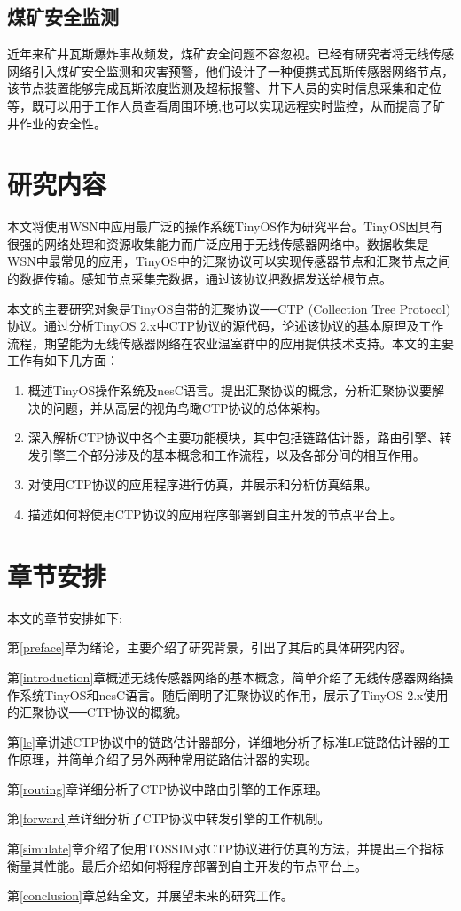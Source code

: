 \subsection{煤矿安全监测}
近年来矿井瓦斯爆炸事故频发，煤矿安全问题不容忽视。已经有研究者将无线传感网络引入煤矿安全监测和灾害预警，他们设计了一种便携式瓦斯传感器网络节点，该节点装置能够完成瓦斯浓度监测及超标报警、井下人员的实时信息采集和定位等，既可以用于工作人员查看周围环境,也可以实现远程实时监控，从而提高了矿井作业的安全性。

\section{研究内容}
本文将使用WSN中应用最广泛的操作系统TinyOS作为研究平台。TinyOS因具有很强的网络处理和资源收集能力而广泛应用于无线传感器网络中。数据收集是WSN中最常见的应用，TinyOS中的汇聚协议可以实现传感器节点和汇聚节点之间的数据传输。感知节点采集完数据，通过该协议把数据发送给根节点。

本文的主要研究对象是TinyOS自带的汇聚协议──CTP (Collection Tree Protocol)协议。通过分析TinyOS 2.x中CTP协议的源代码，论述该协议的基本原理及工作流程，期望能为无线传感器网络在农业温室群中的应用提供技术支持。本文的主要工作有如下几方面：
\vspace{-10pt}
\begin{enumerate}
	\item 概述TinyOS操作系统及nesC语言。提出汇聚协议的概念，分析汇聚协议要解决的问题，并从高层的视角鸟瞰CTP协议的总体架构。
	\item 深入解析CTP协议中各个主要功能模块，其中包括链路估计器，路由引擎、转发引擎三个部分涉及的基本概念和工作流程，以及各部分间的相互作用。
	\item 对使用CTP协议的应用程序进行仿真，并展示和分析仿真结果。
	\item 描述如何将使用CTP协议的应用程序部署到自主开发的节点平台上。
\end{enumerate}

\section{章节安排}
本文的章节安排如下:

第\ref{preface}章为绪论，主要介绍了研究背景，引出了其后的具体研究内容。

第\ref{introduction}章概述无线传感器网络的基本概念，简单介绍了无线传感器网络操作系统TinyOS和nesC语言。随后阐明了汇聚协议的作用，展示了TinyOS 2.x使用的汇聚协议──CTP协议的概貌。

第\ref{le}章讲述CTP协议中的链路估计器部分，详细地分析了标准LE链路估计器的工作原理，并简单介绍了另外两种常用链路估计器的实现。

第\ref{routing}章详细分析了CTP协议中路由引擎的工作原理。

第\ref{forward}章详细分析了CTP协议中转发引擎的工作机制。

第\ref{simulate}章介绍了使用TOSSIM对CTP协议进行仿真的方法，并提出三个指标衡量其性能。最后介绍如何将程序部署到自主开发的节点平台上。

第\ref{conclusion}章总结全文，并展望未来的研究工作。

